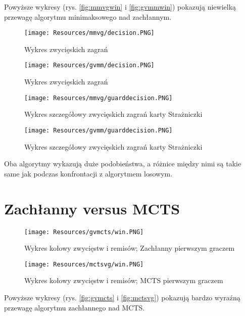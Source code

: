 Powyższe wykresy (rys. \ref{fig:mmvgwin} i \ref{fig:gvmmwin}) pokazują niewielką przewagę algorytmu minimaksowego nad zachłannym.


\begin{figure}[H]
	\centering
	\texttt{[image: Resources/mmvg/decision.PNG]}
	\caption{Wykres zwycięskich zagrań} 
	\label{fig:mmvgdecision}
\end{figure} 

\begin{figure}[H]
	\centering
	\texttt{[image: Resources/gvmm/decision.PNG]}
	\caption{Wykres zwycięskich zagrań} 
	\label{fig:gvmmdecision}
\end{figure} 

\begin{figure}[H]
	\centering
	\texttt{[image: Resources/mmvg/guarddecision.PNG]}
	\caption{Wykres szczegółowy zwycięskich zagrań karty Strażniczki} 
	\label{fig:mmvgguarddecision}
\end{figure}

\begin{figure}[H]
	\centering
	\texttt{[image: Resources/gvmm/guarddecision.PNG]}
	\caption{Wykres szczegółowy zwycięskich zagrań karty Strażniczki} 
	\label{fig:gvmmguarddecision}
\end{figure}


Oba algorytmy wykazują duże podobieństwa, a różnice między nimi są takie same jak podczas konfrontacji z algorytmem losowym.
\clearpage
\section{Zachłanny versus MCTS}

\begin{figure}[H]
	\centering
	\texttt{[image: Resources/gvmcts/win.PNG]}
	\caption{Wykres kołowy zwycięstw i remisów; Zachłanny pierwszym graczem} 
	\label{fig:gvmctswin}
\end{figure}

\begin{figure}[H]
	\centering
	\texttt{[image: Resources/mctsvg/win.PNG]}
	\caption{Wykres kołowy zwycięstw i remisów; MCTS pierwszym graczem} 
	\label{fig:mctsvgwin}
\end{figure}

Powyższe wykresy (rys. \ref{fig:gvmcts} i \ref{fig:mctsvg}) pokazują bardzo wyraźną przewagę algorytmu zachłannego nad MCTS.

